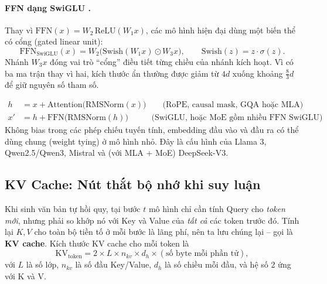 \paragraph{FFN dạng SwiGLU \cite{shazeer2020glu}.} Thay vì $\text{FFN}(x) = W_2\,\text{ReLU}(W_1 x)$, các mô hình hiện đại dùng một biến thể có cổng (gated linear unit):
\[
\text{FFN}_{\text{SwiGLU}}(x) = W_2\Big(\text{Swish}(W_1 x) \odot W_3 x\Big), \qquad \text{Swish}(z) = z\cdot\sigma(z).
\]
Nhánh $W_3 x$ đóng vai trò “cổng” điều tiết từng chiều của nhánh kích hoạt. Vì có ba ma trận thay vì hai, kích thước ẩn thường được giảm từ $4d$ xuống khoảng $\tfrac{8}{3}d$ để giữ nguyên số tham số.

\begin{tcolorbox}[title={Công thức “chuẩn” của một khối decoder năm 2026}, colback=blue!5!white, colframe=blue!60!black, fonttitle=\bfseries]
\begin{align*}
h &= x + \text{Attention}\big(\text{RMSNorm}(x)\big) \qquad \text{(RoPE, causal mask, GQA hoặc MLA)}\\
x' &= h + \text{FFN}\big(\text{RMSNorm}(h)\big) \qquad\;\;\; \text{(SwiGLU, hoặc MoE gồm nhiều FFN SwiGLU)}
\end{align*}
Không bias trong các phép chiếu tuyến tính, embedding đầu vào và đầu ra có thể dùng chung (weight tying) ở mô hình nhỏ. Đây là cấu hình của Llama 3, Qwen2.5/Qwen3, Mistral và (với MLA + MoE) DeepSeek-V3.
\end{tcolorbox}

\subsection{KV Cache: Nút thắt bộ nhớ khi suy luận}
\label{ssec:kv_cache}

Khi sinh văn bản tự hồi quy, tại bước $t$ mô hình chỉ cần tính Query cho \emph{token mới}, nhưng phải so khớp nó với Key và Value của \emph{tất cả} các token trước đó. Tính lại $K, V$ cho toàn bộ tiền tố ở mỗi bước là lãng phí, nên ta lưu chúng lại -- gọi là \textbf{KV cache}. Kích thước KV cache cho mỗi token là
\[
\text{KV}_{\text{token}} = 2 \times L \times n_{kv} \times d_h \times (\text{số byte mỗi phần tử}),
\]
với $L$ là số lớp, $n_{kv}$ là số đầu Key/Value, $d_h$ là số chiều mỗi đầu, và hệ số 2 ứng với K và V.

